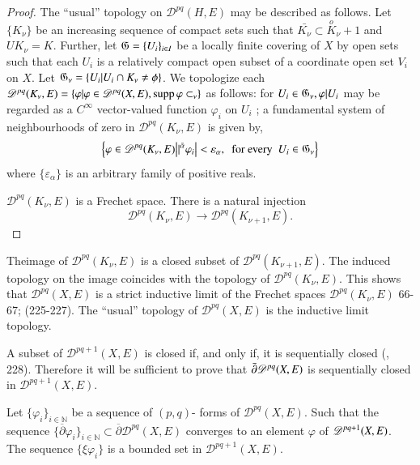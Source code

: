 \begin{proof}
  The ``usual'' topology on $\mathscr{D}^{pq}(H,E)$ may be described
  as follows. Let $\{ K_\nu \}$ be an increasing sequence of compact sets such
  that $\bar{K_\nu}\subset \overset{o}K{_\nu+1}$ and $U K_\nu =
  K$. Further, let $\mathfrak{G} = \{U_i \}_{i\in  I}$ be a locally
  finite covering of $X$ by open sets such that each $U_i$ is a
  relatively compact open subset of a coordinate open set $V_i$ on
  $X$. Let $\mathfrak{G}_{\nu} = \{ U_i \arrowvert U_i\cap K_\nu
  \neq \phi  \}$. We topologize each $\mathscr{D}^{pq}(K_\nu ,E) =
  \{ \varphi | \varphi \in \mathscr{D}^{pq} (X,E), \operatorname{supp} \varphi
  \subset_\nu \}$ as follows: for $U_i \in \mathfrak{G}_\nu , \varphi |
  U_i$ may be regarded as a $C^\infty$ vector-valued function
  $\varphi_i$ on $U_i$ ; a fundamental system of neighbourhoods of
  zero in $\mathscr{D}^{pq}(K_\nu , E)$ is given by,  
  \begin{equation*}
    \left\{ \varphi \in \mathscr{D}^{pq}(K_\nu ,E)\big |
    \arrowvert {}^{\bar{\alpha}} \varphi_i \big | < \varepsilon_\alpha,
    ~\text{ for every }~ U_i \in \mathfrak{G}_\nu \right\}  
  \end{equation*}	
  where $\{\varepsilon_\alpha \}$ is an arbitrary family of positive  reals. 
  
$\mathscr{D}^{pq}(K_\nu ,E)$ is a Frechet space. There is a natural injection 
$$
  \mathscr{D}^{pq}(K_\nu , E)\rightarrow \mathscr{D}^{pq}(K_{\nu+1},
  E). 
$$	
\end{proof}
		
The\pageoriginale image of $\mathscr{D}^{pq}(K_{\nu},E)$ is a closed
subset of 
$\mathscr{D}^{pq}(K_{\nu+1},E)$. The induced topology on the image
coincides with the topology of $\mathscr{D}^{pq}(K_{\nu},E)$. This
shows that $\mathscr{D}^{pq}(X,E)$ is a strict inductive 
limit of the Frechet spaces
$\mathscr{D}^{pq}(K_{\nu},E)$ \cite{key8} {66-67}; \cite{key9}
(225-227). The ``usual'' 
topology of $\mathscr{D}^{pq}(X,E)$ is the inductive limit topology. 

A subset of $\mathscr{D}^{pq+1}(X,E)$ is closed if, and only if,
it is sequentially closed (\cite{key19}, 228). Therefore it will be sufficient
to prove that $\bar{\partial}\mathscr{D}^{pq}\break(X,E)$ is sequentially
closed in $\mathscr{D}^{pq+1}(X,E)$. 

Let $\{\varphi_{i}\}_{i \in \mathbb{N}} $ be a sequence of $(p,q)$-
forms of $\mathscr{D}^{pq}(X,E)$. Such that the sequence
$\{\overline{\partial}\varphi_{i}\}_{i \in\mathbb{N}} \subset
\overline{\partial}\mathscr{D}^{pq}(X,E)$ converges to an element
$\varphi$ of $\mathscr{D}^{pq+1}\break(X,E)$. The sequence $\{ \xi
\varphi_{i}\}$ is a bounded set in $\mathscr{D}^{pq+1}(X,E)$. 

